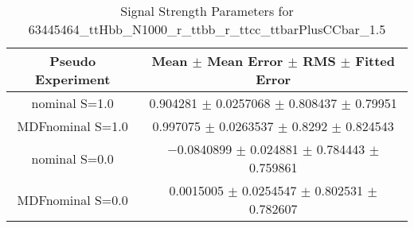\begin{table}
\centering
\caption{Signal Strength Parameters for 63445464\_ttHbb\_N1000\_r\_ttbb\_r\_ttcc\_ttbarPlusCCbar\_1.5}
\begin{tabular}{cc}
\toprule
Pseudo Experiment & Mean $\pm$ Mean Error $\pm$ RMS $\pm$ Fitted Error\\
\midrule
nominal S=1.0 & \num{0.904281} $\pm$ \num{0.0257068} $\pm$ \num{0.808437} $\pm$ \num{0.79951}\\
MDFnominal S=1.0 & \num{0.997075} $\pm$ \num{0.0263537} $\pm$ \num{0.8292} $\pm$ \num{0.824543}\\
nominal S=0.0 & \num{-0.0840899} $\pm$ \num{0.024881} $\pm$ \num{0.784443} $\pm$ \num{0.759861}\\
MDFnominal S=0.0 & \num{0.0015005} $\pm$ \num{0.0254547} $\pm$ \num{0.802531} $\pm$ \num{0.782607}\\
\bottomrule
\end{tabular}
\end{table}